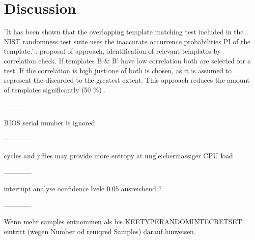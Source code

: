 \section{Discussion}

'It has been shown that the overlapping template matching test included in the NIST randomness test suite uses the inaccurate occurrence probabilities PI of the template.'
\cite{hamano2007correction,chen2016templates}. \cite{chen2016templates} proposal of approach, identification of relevant templates by correlation check. If templates B \&  B' have low correlation
both are selected for a test. If the correlation is high just one of both is chosen, as it is assumed to represent the discarded to the greatest extent. This approach reduces the amount of templates significantly (50 \%) \cite{chen2016templates}.

------------

BIOS serial number is ignored

------------

cycles and jiffies may provide more entropy at ungleichermassiger CPU load

------------

interrupt analyse ocnfidence lvele 0.05 ausreichend ?

------------

 Wenn mehr samples entnommen als bis KEETYPERANDOMINTECRETSET eintritt (wegen Number od reuiqred Samples) darauf hinweisen.
